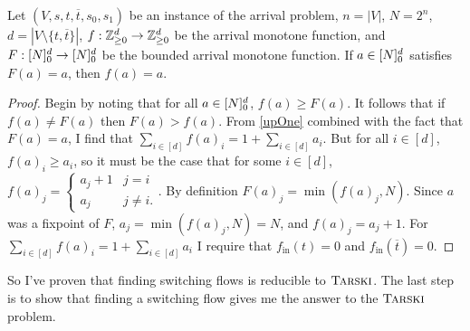   \begin{lemma}
    Let $(V, s, t, \overline{t}, s_0, s_1)$ be an instance of the arrival problem, 
    $n = |V|$, $N = 2^n$, $d = |V \setminus \{t, \overline{t}\}|$, 
    $f : \mathbb{Z}_{\geq 0}^d \to \mathbb{Z}_{\geq 0}^d$ be the arrival monotone function, and $F : [N]_0^d \to [N]_0^d$
    be the bounded arrival monotone function.
    If $a \in [N]_0^d$ satisfies $F(a) = a$, then $f(a) = a$. 
  \end{lemma}
  \begin{proof}
    Begin by noting that for all $a \in [N]_0^d$, $f(a) \geq F(a)$. It follows that if $f(a) \neq F(a)$ then
    $F(a) > f(a)$. From \cref{upOne} combined with the fact that $F(a) = a$, I find that 
    $\sum_{i \in [d]} f(a)_i = 1 + \sum_{i \in [d]} a_i$. But for all $i \in [d]$, $f(a)_i \geq a_i$,
    so it must be the case that for some $i \in [d]$, $f(a)_j = 
    \begin{cases} a_j + 1 & j = i \\ a_j & j \neq i. \end{cases}$. By definition $F(a)_j = \min(f(a)_j, N)$.
      Since $a$ was a fixpoint of $F$, $a_j = \min(f(a)_j, N) = N$, and $f(a)_j = a_j + 1$.
    For $\sum_{i \in [d]} f(a)_i = 1 + \sum_{i \in [d]} a_i$ I require that $f_{\text{in}}(t) = 0$ and $f_{\text{in}}(\overline{t}) = 0$.
  \end{proof}
  So I've proven that finding switching flows is reducible to $\textsc{Tarski}$. The last step is to show that
  finding a switching flow gives me the answer to the $\textsc{Tarski}$ problem.
